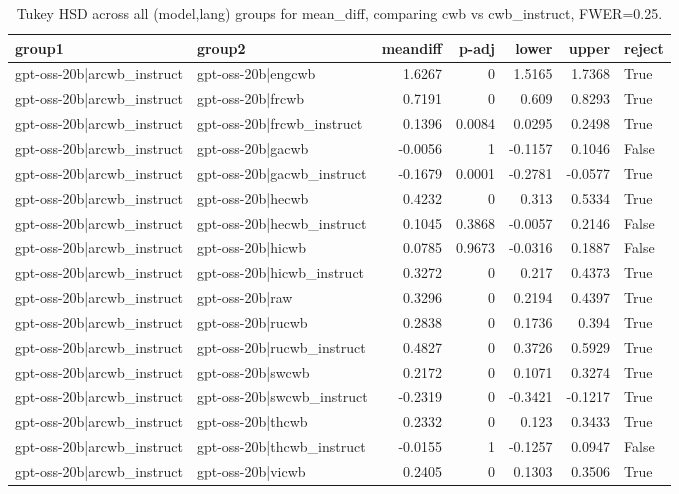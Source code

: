 \begin{table}
\caption{Tukey HSD across all (model,lang) groups for mean_diff, comparing cwb vs cwb_instruct, FWER=0.25.}
\label{tab:tukey_all_models_all_langs_mean_diff_cwb_vs_cwb_instruct}
\begin{tabular}{l l r r r r l}
\toprule
group1 & group2 & meandiff & p-adj & lower & upper & reject \\
\midrule
gpt-oss-20b|arcwb_instruct & gpt-oss-20b|engcwb & 1.6267 & 0 & 1.5165 & 1.7368 & True \\
gpt-oss-20b|arcwb_instruct & gpt-oss-20b|frcwb & 0.7191 & 0 & 0.609 & 0.8293 & True \\
gpt-oss-20b|arcwb_instruct & gpt-oss-20b|frcwb_instruct & 0.1396 & 0.0084 & 0.0295 & 0.2498 & True \\
gpt-oss-20b|arcwb_instruct & gpt-oss-20b|gacwb & -0.0056 & 1 & -0.1157 & 0.1046 & False \\
gpt-oss-20b|arcwb_instruct & gpt-oss-20b|gacwb_instruct & -0.1679 & 0.0001 & -0.2781 & -0.0577 & True \\
gpt-oss-20b|arcwb_instruct & gpt-oss-20b|hecwb & 0.4232 & 0 & 0.313 & 0.5334 & True \\
gpt-oss-20b|arcwb_instruct & gpt-oss-20b|hecwb_instruct & 0.1045 & 0.3868 & -0.0057 & 0.2146 & False \\
gpt-oss-20b|arcwb_instruct & gpt-oss-20b|hicwb & 0.0785 & 0.9673 & -0.0316 & 0.1887 & False \\
gpt-oss-20b|arcwb_instruct & gpt-oss-20b|hicwb_instruct & 0.3272 & 0 & 0.217 & 0.4373 & True \\
gpt-oss-20b|arcwb_instruct & gpt-oss-20b|raw & 0.3296 & 0 & 0.2194 & 0.4397 & True \\
gpt-oss-20b|arcwb_instruct & gpt-oss-20b|rucwb & 0.2838 & 0 & 0.1736 & 0.394 & True \\
gpt-oss-20b|arcwb_instruct & gpt-oss-20b|rucwb_instruct & 0.4827 & 0 & 0.3726 & 0.5929 & True \\
gpt-oss-20b|arcwb_instruct & gpt-oss-20b|swcwb & 0.2172 & 0 & 0.1071 & 0.3274 & True \\
gpt-oss-20b|arcwb_instruct & gpt-oss-20b|swcwb_instruct & -0.2319 & 0 & -0.3421 & -0.1217 & True \\
gpt-oss-20b|arcwb_instruct & gpt-oss-20b|thcwb & 0.2332 & 0 & 0.123 & 0.3433 & True \\
gpt-oss-20b|arcwb_instruct & gpt-oss-20b|thcwb_instruct & -0.0155 & 1 & -0.1257 & 0.0947 & False \\
gpt-oss-20b|arcwb_instruct & gpt-oss-20b|vicwb & 0.2405 & 0 & 0.1303 & 0.3506 & True \\

\end{tabular}
\end{table}
